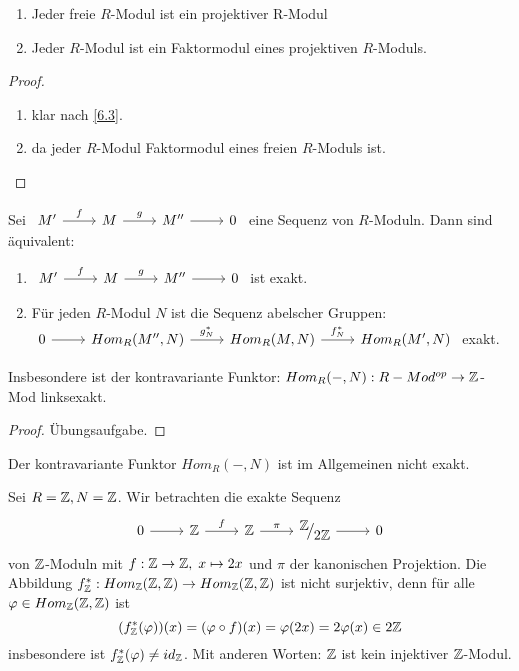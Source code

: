 \begin{fo}\label{6.4}
	\begin{enumerate} [label= \alph*)]
		\item Jeder freie $R$-Modul ist ein projektiver R-Modul
		\item Jeder $R$-Modul ist ein Faktormodul eines projektiven $R$-Moduls. 
	\end{enumerate}
\end{fo}
\begin{proof}
	\begin{enumerate} [label= \alph*)]
		\item klar nach \ref{6.3}.
		\item da jeder $R$-Modul Faktormodul eines freien $R$-Moduls ist. 
	\end{enumerate}
\end{proof}
\begin{sa}\label{6.5}
	Sei $\begin{tikzcd}
	 M' \arrow{r}{f} & M \arrow{r}{g} & M'' \arrow{r} & 0
	\end{tikzcd} $ eine Sequenz von $R$-Moduln. Dann sind äquivalent:
	\begin{enumerate} [label= \roman*)]
		\item $\begin{tikzcd}
		M' \arrow{r}{f} & M \arrow{r}{g} & M'' \arrow{r} & 0
		\end{tikzcd} $ ist exakt.
		\item Für jeden $R$-Modul $N$ ist die Sequenz abelscher Gruppen: \\
		$\begin{tikzcd}
		0  \arrow{r} & Hom_{R}(M'',N) \arrow{r}{g_{N}^{*}} & Hom_{R}(M,N)  \arrow{r}{f_{N}^{*}} & Hom_{R}(M',N) \end{tikzcd}$ exakt.
	\end{enumerate}
	Insbesondere ist der kontravariante Funktor: $Hom_R(-,N): R-Mod^{op} \to \mathbb{Z}$-Mod  linksexakt.
\end{sa}
\begin{proof}
	Übungsaufgabe.
\end{proof}
\begin{anm}
	Der kontravariante Funktor $Hom_R(-,N) $ ist im Allgemeinen nicht exakt.
\end{anm}
\begin{bsp}
	Sei $ R= \mathbb{Z} , N = \mathbb{Z} $. Wir betrachten die exakte Sequenz \\
	 $$\begin{tikzcd}
	0  \arrow{r} & \Z \arrow{r}{f} & \Z \arrow{r}{\pi} & \QR{\Z}{2\Z} \arrow{r} & 0
	\end{tikzcd} $$ von $\mathbb{Z}$-Moduln mit $f: \mathbb{Z} \to \mathbb{Z} ,\; x \mapsto 2x$ und $ \pi $ der kanonischen Projektion. Die Abbildung $ f_{\mathbb{Z}}^{*} : Hom_{\mathbb{Z}}(\mathbb{Z},\mathbb{Z}) \to Hom_{\mathbb{Z}}(\mathbb{Z},\mathbb{Z})$ ist nicht surjektiv, denn für alle $\varphi \in Hom_{\mathbb{Z}}(\mathbb{Z},\mathbb{Z})$ ist $$ (f_{\mathbb{Z}}^{*}(\varphi))(x) = (\varphi \circ f)(x) = \varphi(2x) =2 \varphi(x) \in 2\mathbb{Z}$$
	insbesondere ist $ f_{\mathbb{Z}}^{*}(\varphi) \neq id_{\mathbb{Z}}$. Mit anderen Worten: $\mathbb{Z}$ ist kein injektiver $\mathbb{Z}$-Modul.
\end{bsp}
